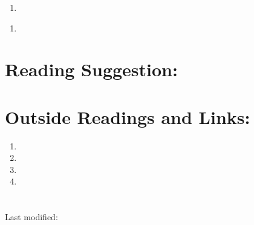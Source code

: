 \documentclass[12pt]{article}
\begin{document}
\begin{exercise}
  
\end{exercise}
\begin{solution}
  
\end{solution}
\begin{exercise}
  \begin{enumerate}[label=(\alpha*)]
  \item 
  \end{enumerate}
\end{exercise}
\begin{solution}
  \begin{enumerate}[label=(\alpha*)]
  \item 
  \end{enumerate}
\end{solution}

\hr

\section*{Reading Suggestion:}




\hr

\section*{Outside Readings and Links:}
\begin{enumerate}
  \item  
  \item  
  \item  
  \item 
\end{enumerate}

\section*{\solutionsname}
\loadSolutions

\hr

\mydisclaim \myfooter

Last modified:  \flastmod
\end{document}
